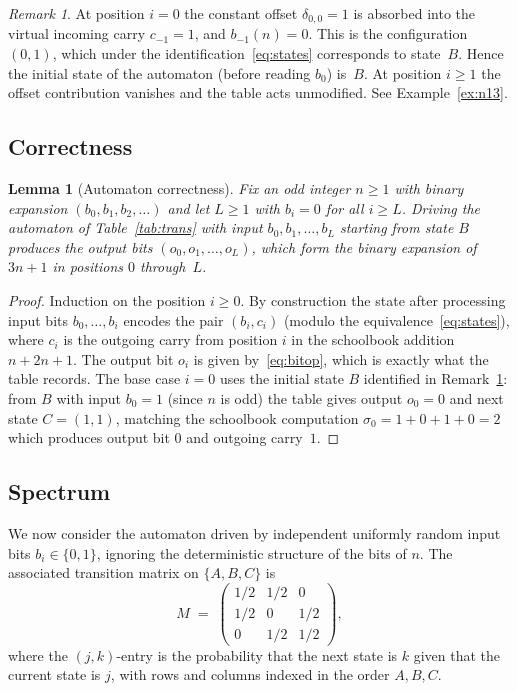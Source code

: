 \documentclass[11pt,a4paper]{article}
\newtheorem{lemma}[theorem]{Lemma}
\theoremstyle{definition}
\theoremstyle{remark}
\newtheorem{remark}[theorem]{Remark}
\begin{document}
\begin{remark}\label{rem:initialstate}
At position $i = 0$ the constant offset $\delta_{0,0} = 1$ is absorbed
into the virtual incoming carry $c_{-1} = 1$, and $b_{-1}(n) = 0$.
This is the configuration $(0, 1)$, which under the
identification~\eqref{eq:states} corresponds to state~$B$.  Hence the
initial state of the automaton (before reading $b_0$) is~$B$.  At
position $i \geq 1$ the offset contribution vanishes and the table acts
unmodified.  See Example~\ref{ex:n13}.
\end{remark}

\subsection{Correctness}

\begin{lemma}[Automaton correctness]\label{lem:correct}
Fix an odd integer $n \geq 1$ with binary expansion
$(b_0, b_1, b_2, \dots)$ and let $L \geq 1$ with $b_i = 0$ for all
$i \geq L$.  Driving the automaton of Table~\ref{tab:trans} with input
$b_0, b_1, \dots, b_L$ starting from state $B$ produces the output bits
$(o_0, o_1, \dots, o_L)$, which form the binary expansion of $3n + 1$
in positions $0$ through~$L$.
\end{lemma}

\begin{proof}
Induction on the position $i \geq 0$.  By construction the state after
processing input bits $b_0, \dots, b_i$ encodes the pair $(b_i, c_i)$
(modulo the equivalence~\eqref{eq:states}), where $c_i$ is the outgoing
carry from position $i$ in the schoolbook addition $n + 2n + 1$.  The
output bit $o_i$ is given by~\eqref{eq:bitop}, which is exactly what the
table records.  The base case $i = 0$ uses the initial state $B$
identified in Remark~\ref{rem:initialstate}: from $B$ with input
$b_0 = 1$ (since $n$ is odd) the table gives output $o_0 = 0$ and next
state $C = (1, 1)$, matching the schoolbook computation
$\sigma_0 = 1 + 0 + 1 + 0 = 2$ which produces output bit $0$ and
outgoing carry~$1$.
\end{proof}

\subsection{Spectrum}

We now consider the automaton driven by independent uniformly random
input bits $b_i \in \{0, 1\}$, ignoring the deterministic structure of
the bits of $n$.  The associated transition matrix on $\{A, B, C\}$ is
\begin{equation}\label{eq:M}
  M \;=\;
  \begin{pmatrix}
    1/2 & 1/2 & 0 \\
    1/2 & 0 & 1/2 \\
    0 & 1/2 & 1/2
  \end{pmatrix},
\end{equation}
where the $(j, k)$-entry is the probability that the next state is $k$
given that the current state is $j$, with rows and columns indexed in
the order $A, B, C$.
\end{document}

